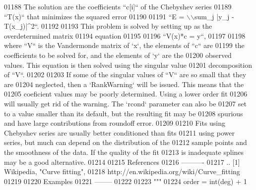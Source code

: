 \begin{DoxyCode}
01188 \textcolor{stringliteral}{    The solution are the coefficients ``c[i]`` of the Chebyshev series}
01189 \textcolor{stringliteral}{    ``T(x)`` that minimizes the squared error}
01190 \textcolor{stringliteral}{}
01191 \textcolor{stringliteral}{    ``E = \(\backslash\)\(\backslash\)sum\_j |y\_j - T(x\_j)|^2``.}
01192 \textcolor{stringliteral}{}
01193 \textcolor{stringliteral}{    This problem is solved by setting up as the overdetermined matrix}
01194 \textcolor{stringliteral}{    equation}
01195 \textcolor{stringliteral}{}
01196 \textcolor{stringliteral}{    ``V(x)*c = y``,}
01197 \textcolor{stringliteral}{}
01198 \textcolor{stringliteral}{    where ``V`` is the Vandermonde matrix of `x`, the elements of ``c`` are}
01199 \textcolor{stringliteral}{    the coefficients to be solved for, and the elements of `y` are the}
01200 \textcolor{stringliteral}{    observed values.  This equation is then solved using the singular value}
01201 \textcolor{stringliteral}{    decomposition of ``V``.}
01202 \textcolor{stringliteral}{}
01203 \textcolor{stringliteral}{    If some of the singular values of ``V`` are so small that they are}
01204 \textcolor{stringliteral}{    neglected, then a `RankWarning` will be issued. This means that the}
01205 \textcolor{stringliteral}{    coeficient values may be poorly determined. Using a lower order fit}
01206 \textcolor{stringliteral}{    will usually get rid of the warning.  The `rcond` parameter can also be}
01207 \textcolor{stringliteral}{    set to a value smaller than its default, but the resulting fit may be}
01208 \textcolor{stringliteral}{    spurious and have large contributions from roundoff error.}
01209 \textcolor{stringliteral}{}
01210 \textcolor{stringliteral}{    Fits using Chebyshev series are usually better conditioned than fits}
01211 \textcolor{stringliteral}{    using power series, but much can depend on the distribution of the}
01212 \textcolor{stringliteral}{    sample points and the smoothness of the data. If the quality of the fit}
01213 \textcolor{stringliteral}{    is inadequate splines may be a good alternative.}
01214 \textcolor{stringliteral}{}
01215 \textcolor{stringliteral}{    References}
01216 \textcolor{stringliteral}{    ----------}
01217 \textcolor{stringliteral}{    .. [1] Wikipedia, "Curve fitting",}
01218 \textcolor{stringliteral}{           http://en.wikipedia.org/wiki/Curve\_fitting}
01219 \textcolor{stringliteral}{}
01220 \textcolor{stringliteral}{    Examples}
01221 \textcolor{stringliteral}{    --------}
01222 \textcolor{stringliteral}{}
01223 \textcolor{stringliteral}{    """}
01224     order = int(deg) + 1

\end{DoxyCode}
